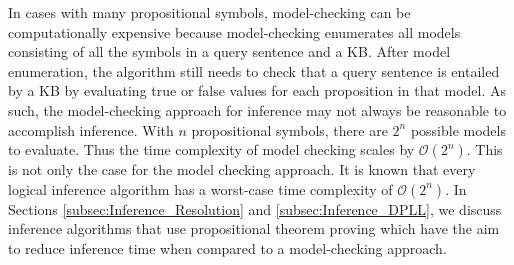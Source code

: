 \begin{enumerate}

\end{enumerate}

In cases with many propositional symbols, model-checking can be computationally expensive because model-checking enumerates all models consisting of all the symbols in a query sentence and a KB. After model enumeration, the algorithm still needs to check that a query sentence is entailed by a KB by evaluating true or false values for each proposition in that model. As such, the model-checking approach for inference may not always be reasonable to accomplish inference. With $n$ propositional symbols, there are $2^n$ possible models to evaluate. Thus the time complexity of model checking scales by $\mathcal{O}(2^n)$. This is not only the case for the model checking approach. It is known that every logical inference algorithm has a worst-case time complexity of $\mathcal{O}(2^n)$. In Sections \ref{subsec:Inference_Resolution} and \ref{subsec:Inference_DPLL}, we discuss inference algorithms that use propositional theorem proving which have the aim to reduce inference time when compared to a model-checking approach.


